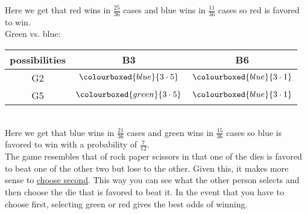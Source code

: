 Here we get that red wins in $\frac{25}{36}$ cases and blue wins in $\frac{11}{36}$ cases so red is favored to win.\\
Green vs. blue:\\
\begin{tabular}{c|cc}
possibilities & B3 & B6\\
\hline
G2 & $\colourboxed{blue}{3\cdot5}$ & $\colourboxed{blue}{3\cdot1}$\\
G5 & $\colourboxed{green}{3\cdot5}$ & $\colourboxed{blue}{3\cdot1}$
\end{tabular}\\
Here we get that blue wins in $\frac{21}{36}$ cases and green wins in $\frac{15}{36}$ cases so blue is favored to win with a probability of $\frac{7}{12}$.\\

The game resembles that of rock paper scissors in that one of the dies is favored to beat one of the other two but lose to the other. Given this, it makes more sense to \underline{choose second}. This way you can see what the other person selects and then choose the die that is favored to beat it. In the event that you have to choose first, selecting green or red gives the best odds of winning.

